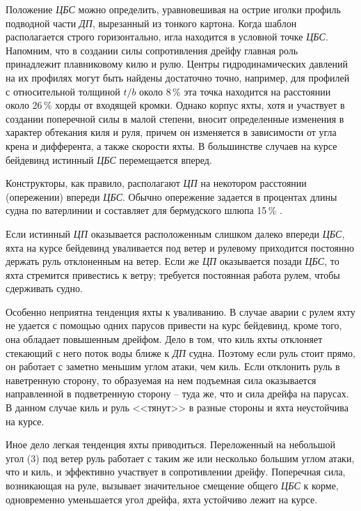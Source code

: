 Положение \textit{ЦБС} можно определить, уравновешивая на острие иголки профиль подводной части \textit{ДП}, вырезанный из тонкого картона. Когда шаблон располагается строго горизонтально, игла находится в условной точке \textit{ЦБС}. Напомним, что в создании силы сопротивления дрейфу главная роль принадлежит плавниковому килю и рулю. Центры гидродинамических давлений на их профилях могут быть найдены достаточно точно, например, для профилей с относительной толщиной $t/b$ около 8\,\% эта точка находится на расстоянии около 26\,\% хорды от входящей кромки. Однако корпус яхты, хотя и участвует в создании поперечной силы в малой степени, вносит определенные изменения в характер обтекания киля и руля, причем он изменяется в зависимости от угла крена и дифферента, а также скорости яхты. В большинстве случаев на курсе бейдевинд истинный \textit{ЦБС} перемещается вперед. 

Конструкторы, как правило, располагают \textit{ЦП} на некотором расстоянии (опережении) впереди \textit{ЦБС}. Обычно опережение задается в процентах длины судна по ватерлинии и составляет для бермудского шлюпа 15\,\% \lkvl.

Если истинный \textit{ЦП} оказывается расположенным слишком далеко впереди \textit{ЦБС}, яхта на курсе бейдевинд уваливается под ветер и рулевому приходится постоянно держать руль отклоненным на ветер. Если же \textit{ЦП} оказывается позади \textit{ЦБС}, то яхта стремится привестись к ветру; требуется постоянная работа рулем, чтобы сдерживать судно. 

Особенно неприятна тенденция яхты к уваливанию. В случае аварии с рулем яхту не удается с помощью одних парусов привести на курс бейдевинд, кроме того, она обладает повышенным дрейфом. Дело в том, что киль яхты отклоняет стекающий с него поток воды ближе к \textit{ДП} судна. Поэтому если руль стоит прямо, он работает с заметно меньшим углом атаки, чем киль. Если отклонить руль в наветренную сторону, то образуемая на нем подъемная сила оказывается направленной в подветренную сторону \--- туда же, что и сила дрейфа на парусах. В данном случае киль и руль <<тянут>> в разные стороны и яхта неустойчива на курсе.

Иное дело легкая тенденция яхты приводиться. Переложенный на небольшой угол (3\gr) под ветер руль работает с таким же или несколько большим углом атаки, что и киль, и эффективно участвует в сопротивлении дрейфу. Поперечная сила, возникающая на руле, вызывает значительное смещение общего \textit{ЦБС} к корме, одновременно уменьшается угол дрейфа, яхта устойчиво лежит на курсе.

